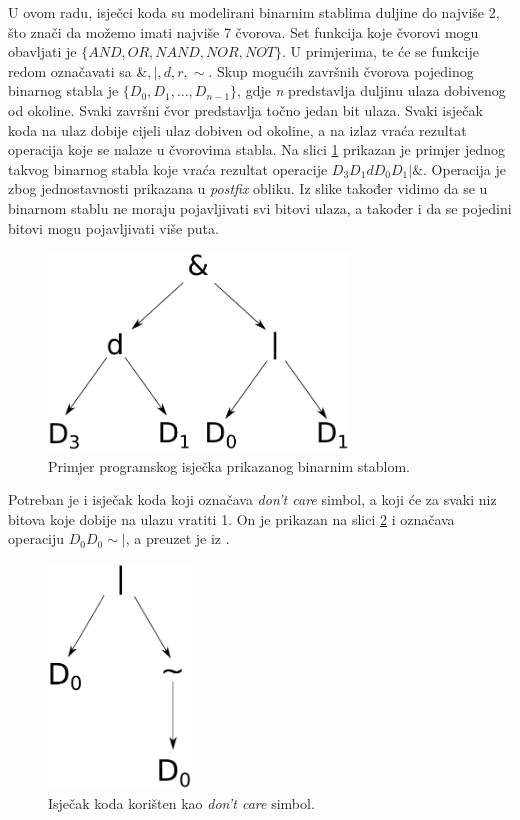 \documentclass[times, utf8, zavrsni]{fer}
\begin{document}
U ovom radu, isječci koda su modelirani binarnim stablima duljine do najviše 2, što znači da možemo imati najviše 7 čvorova.
Set funkcija koje čvorovi mogu obavljati je $\{AND, OR, NAND, NOR, NOT\}$.
U primjerima, te će se funkcije redom označavati sa $\&, |, d, r, \sim$.
Skup mogućih završnih čvorova pojedinog binarnog stabla je $\{D_{0}, D_{1}, ..., D_{n - 1}\}$, gdje \emph{n} predstavlja duljinu ulaza dobivenog od okoline.
Svaki završni čvor predstavlja točno jedan bit ulaza.
Svaki isječak koda na ulaz dobije cijeli ulaz dobiven od okoline, a na izlaz vraća rezultat operacija koje se nalaze u čvorovima stabla.
Na slici \ref{tree} prikazan je primjer jednog takvog binarnog stabla koje vraća rezultat operacije $D_{3}D_{1}dD_{0}D_{1}|\&$.
Operacija je zbog jednostavnosti prikazana u \emph{postfix} obliku.
Iz slike također vidimo da se u binarnom stablu ne moraju pojavljivati svi bitovi ulaza, a također i da se pojedini bitovi mogu pojavljivati više puta.

\begin{figure}
\centering
\includegraphics[width=8cm]{img/tree.pdf}
\caption{Primjer programskog isječka prikazanog binarnim stablom.}
\label{tree}
\end{figure}

Potreban je i isječak koda koji označava \emph{don't care} simbol, a koji će za svaki niz bitova koje dobije na ulazu vratiti 1.
On je prikazan na slici \ref{dnc} i označava operaciju $D_{0}D_{0}\sim|$, a preuzet je iz \citep{4}.

\begin{figure}
\centering
\includegraphics[height=6cm]{img/dnc.pdf}
\caption{Isječak koda korišten kao \emph{don't care} simbol.}
\label{dnc}
\end{figure}
\end{document}
